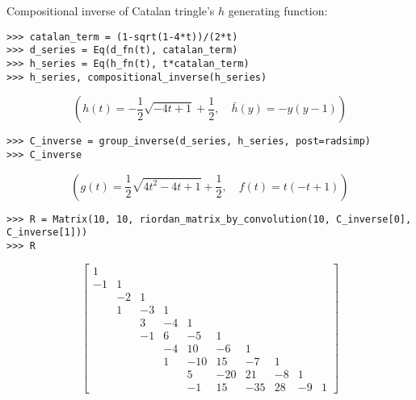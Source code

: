 \begin{example}
Compositional inverse of Catalan tringle's $h$ generating function:
\begin{verbatim}
>>> catalan_term = (1-sqrt(1-4*t))/(2*t)
>>> d_series = Eq(d_fn(t), catalan_term)
>>> h_series = Eq(h_fn(t), t*catalan_term)
>>> h_series, compositional_inverse(h_series)
\end{verbatim}
\begin{displaymath}
\left ( h{\left (t \right )} = - \frac{1}{2} \sqrt{- 4 t + 1} + \frac{1}{2}, \quad \bar{ h }{\left (y \right )} = - y \left(y - 1\right)\right )
\end{displaymath}
\begin{verbatim}
>>> C_inverse = group_inverse(d_series, h_series, post=radsimp)
>>> C_inverse
\end{verbatim}
\begin{displaymath}
\left ( g{\left (t \right )} = \frac{1}{2} \sqrt{4 t^{2} - 4 t + 1} + \frac{1}{2}, \quad f{\left (t \right )} = t \left(- t + 1\right)\right )
\end{displaymath}
\begin{verbatim}
>>> R = Matrix(10, 10, riordan_matrix_by_convolution(10, C_inverse[0], C_inverse[1]))
>>> R
\end{verbatim}
\begin{displaymath}
\left[\begin{matrix}1 &   &   &   &   &   &   &   &   &  \\-1 & 1 &   &   &   &   &   &   &   &  \\  & -2 & 1 &   &   &   &   &   &   &  \\  & 1 & -3 & 1 &   &   &   &   &   &  \\  &   & 3 & -4 & 1 &   &   &   &   &  \\  &   & -1 & 6 & -5 & 1 &   &   &   &  \\  &   &   & -4 & 10 & -6 & 1 &   &   &  \\  &   &   & 1 & -10 & 15 & -7 & 1 &   &  \\  &   &   &   & 5 & -20 & 21 & -8 & 1 &  \\  &   &   &   & -1 & 15 & -35 & 28 & -9 & 1\end{matrix}\right]
\end{displaymath}
\end{example}

